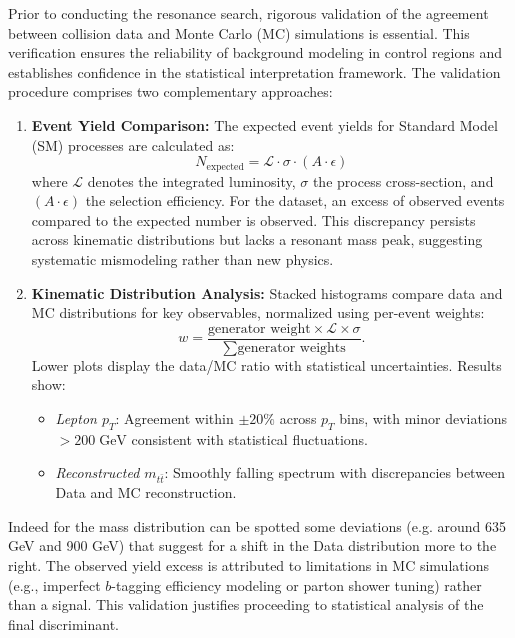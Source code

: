 Prior to conducting the resonance search, rigorous validation of the agreement between collision data and Monte Carlo (MC) simulations is essential. This verification ensures the reliability of background modeling in control regions and establishes confidence in the statistical interpretation framework. The validation procedure comprises two complementary approaches:

\begin{enumerate}
    \item \textbf{Event Yield Comparison:} 
    The expected event yields for Standard Model (SM) processes are calculated as:
    \[
    N_{\text{expected}} = \mathcal{L} \cdot \sigma \cdot (A \cdot \epsilon)
    \]
    where \(\mathcal{L}\) denotes the integrated luminosity, \(\sigma\) the process cross-section, and \((A \cdot \epsilon)\) the selection efficiency. For the dataset, an excess of observed events compared to the expected number is observed. This discrepancy persists across kinematic distributions but lacks a resonant mass peak, suggesting systematic mismodeling rather than new physics.
    
    \item \textbf{Kinematic Distribution Analysis:} 
    Stacked histograms compare data and MC distributions for key observables, normalized using per-event weights:
    \[
    w = \frac{\text{generator weight} \times \mathcal{L} \times \sigma}{\sum \text{generator weights}}.
    \]
    Lower plots display the data/MC ratio with statistical uncertainties. Results show:
    \begin{itemize}
        \item \textit{Lepton \(p_T\)}: Agreement within \(\pm 20\%\) across \(p_T\) bins, with minor deviations \(>200\;\text{GeV}\) consistent with statistical fluctuations.
        \item \textit{Reconstructed \(m_{t\bar{t}}\)}: Smoothly falling spectrum with discrepancies between Data and MC reconstruction.
    \end{itemize}
\end{enumerate}

\noindent Indeed for the mass distribution can be spotted some deviations (e.g. around 635 GeV and 900 GeV) that suggest for a shift in the Data distribution more to the right. The observed yield excess is attributed to limitations in MC simulations (e.g., imperfect \(b\)-tagging efficiency modeling or parton shower tuning) rather than a signal. This validation justifies proceeding to statistical analysis of the final discriminant.

